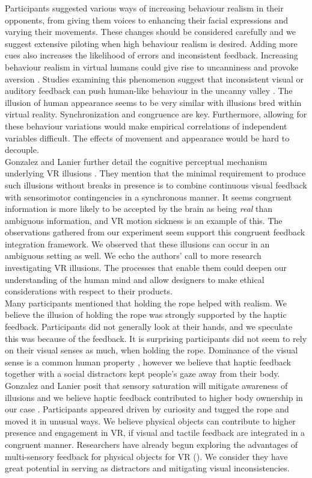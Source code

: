 Participants suggested various ways of increasing behaviour realism in their opponents, from giving them voices to enhancing their facial expressions and varying their movements. These changes should be considered carefully and we suggest extensive piloting when high behaviour realism is desired. Adding more cues also increases the likelihood of errors and inconsistent feedback. Increasing behaviour realism in virtual humans could give rise to uncanniness and provoke aversion \cite{brenton2005uncanny,stein2019stay}. Studies examining this phenomenon suggest that inconsistent visual or auditory feedback can push human-like behaviour in the uncanny valley \cite{seyama2007uncanny}. The illusion of human appearance seems to be very similar with illusions bred within virtual reality. Synchronization and congruence are key. Furthermore, allowing for these behaviour variations would make empirical correlations of independent variables difficult. The effects of movement and appearance would be hard to decouple.
\\
Gonzalez and Lanier further detail the cognitive perceptual mechanism underlying VR illusions \cite{gonzalez2017model}. They mention that the minimal requirement to produce such illusions without breaks in presence is to combine continuous visual feedback with sensorimotor contingencies in a synchronous manner. It seems congruent information is more likely to be accepted by the brain as being \textit{real} than ambiguous information, and VR motion sickness is an example of this. The observations gathered from our experiment seem support this congruent feedback integration framework. We observed that these illusions can occur in an ambiguous setting as well. We echo the authors' call to more research investigating VR illusions. The processes that enable them could deepen our understanding of the human mind and allow designers to make ethical considerations with respect to their products.
\\
Many participants mentioned that holding the rope helped with realism. We believe the illusion of holding the rope was strongly supported by the haptic feedback. Participants did not generally look at their hands, and we speculate this was because of the feedback. It is surprising participants did not seem to rely on their visual senses as much, when holding the rope. Dominance of the visual sense is a common human property \cite{posner1976visual}, however we believe that haptic feedback together with a social distractors kept people's gaze away from their body. Gonzalez and Lanier posit that sensory saturation will mitigate awareness of illusions and we believe haptic feedback contributed to higher body ownership in our case \cite{gonzalez2017model}. Participants appeared driven by curiosity and tugged the rope and moved it in unusual ways. We believe physical objects can contribute to higher presence and engagement in VR, if visual and tactile feedback are integrated in a congruent manner. Researchers have already begun exploring the advantages of multi-sensory feedback for physical objects for VR (\cite{sra2015metaspace}). We consider they have great potential in serving as distractors and mitigating visual inconsistencies.  